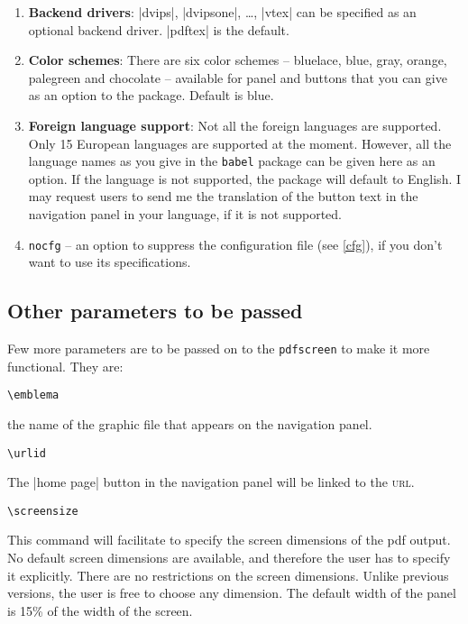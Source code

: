 \documentclass[a4paper]{article}
\def\pdfscreen{\texttt{\small\color{section1}pdfscreen}\xspace}
\begin{document}
\begin{enumerate}
\item \textbf{Backend drivers}: |dvips|, |dvipsone|, \dots, |vtex| can be
specified as an optional backend driver. |pdftex| is the default.

\item \textbf{Color schemes}: There are six color schemes --
bluelace, blue, gray, orange, palegreen and chocolate -- available for
panel and buttons that you can give as an option to the  package.
Default is blue.

\item \textbf{Foreign language support}: Not all the foreign languages
are supported. Only 15 European languages are supported at the moment.
However, all the language names as you give in the \verb+babel+
package can be given here as an option. If the language is not
supported, the package will default to English. I may request users to
send me the translation of the button text in the navigation panel in
your language, if it is not supported.

\item \verb+nocfg+ -- an option to suppress the configuration file (see
\autoref{cfg}), if you don't want to use its specifications.

\end{enumerate}

\subsection{Other parameters to be passed}\label{parameters}
Few more parameters are to be passed on to the \pdfscreen to make it more
functional. They are:

\begin{decl}\verb+\emblema+\end{decl} the name of the graphic file that appears on
the navigation panel.

\begin{decl}\verb+\urlid+\end{decl} The |home page|
button in the navigation panel will be linked to the \textsc{url}.

\begin{decl}\verb+\screensize+\end{decl} 
This command will facilitate to specify the screen dimensions of the
pdf output. No default screen dimensions are available, and therefore
the user has to specify it explicitly. There are no restrictions on the
screen dimensions. Unlike previous versions, the user is free to choose
any dimension. The default width of the panel is 15\% of the width of
the screen.
\end{document}

